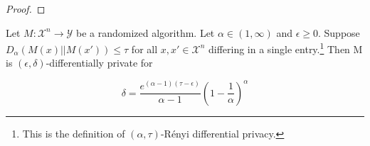 \documentclass{article}
\begin{document}
\begin{lemma}
\begin{proof}





\end{proof}

\end{lemma}

\begin{theorem}
\label{renyidp-approxdp-delta}
\cite{CKS20} Let $M: \mathcal{X}^n \rightarrow \mathcal{Y}$ be a randomized algorithm. Let $\alpha \in (1, \infty)$ and $\epsilon \geq 0$. Suppose $D_\alpha(M(x) || M(x')) \leq \tau$ for all $x, x' \in \mathcal{X}^n$ differing in a single entry.\footnote{This is the definition of $(\alpha, \tau)$-R\'enyi differential privacy.} Then M is $(\epsilon, \delta)$-differentially private for 

\begin{equation}
    \delta = \frac{e^{(\alpha - 1) (\tau - \epsilon)}}{\alpha - 1} \left(1 - \frac{1}{\alpha}\right)^\alpha
\end{equation}
\end{theorem}
\end{document}
